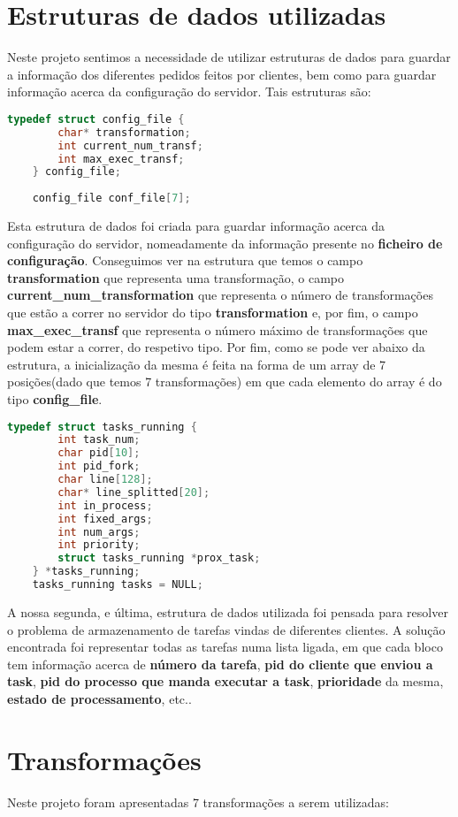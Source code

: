 \documentclass[11pt,a4paper]{report}
\begin{document}
    \section{Estruturas de dados utilizadas}
    Neste projeto sentimos a necessidade de utilizar estruturas de dados para guardar a informação dos diferentes pedidos feitos por clientes, bem como para guardar informação acerca da configuração do servidor. Tais estruturas são:
    \begin{lstlisting}[language=C,firstnumber=1]
    typedef struct config_file {
	    char* transformation;
	    int current_num_transf;
	    int max_exec_transf;
    } config_file;
    
    config_file conf_file[7];
    \end{lstlisting}
    Esta estrutura de dados foi criada para guardar informação acerca da configuração do servidor, nomeadamente da informação presente no \textbf{ficheiro de configuração}. Conseguimos ver na estrutura que temos o campo \textbf{transformation} que representa uma transformação, o campo \textbf{current\_num\_transformation} que representa o número de transformações que estão a correr no servidor do tipo \textbf{transformation} e, por fim, o campo \textbf{max\_exec\_transf} que representa o número máximo de transformações que podem estar a correr, do respetivo tipo. Por fim, como se pode ver abaixo da estrutura, a inicialização da mesma é feita na forma de um array de 7 posições(dado que temos 7 transformações) em que cada elemento do array é do tipo \textbf{config\_file}.
    \\
    \begin{lstlisting}[language=C,firstnumber=1]
    typedef struct tasks_running {
	    int task_num;
	    char pid[10];
	    int pid_fork;
	    char line[128];	
	    char* line_splitted[20];	
	    int in_process;	
	    int fixed_args;
	    int num_args;
	    int priority;
	    struct tasks_running *prox_task;
    } *tasks_running;
    tasks_running tasks = NULL;
    \end{lstlisting}
    A nossa segunda, e última, estrutura de dados utilizada foi pensada para resolver o problema de armazenamento de tarefas vindas de diferentes clientes. A solução encontrada foi representar todas as tarefas numa lista ligada, em que cada bloco tem informação acerca de \textbf{número da tarefa}, \textbf{pid do cliente que enviou a task}, \textbf{pid do processo que manda executar a task}, \textbf{prioridade} da mesma, \textbf{estado de processamento}, etc..

	\section{Transformações}
	Neste projeto foram apresentadas 7 transformações a serem utilizadas:
	
\end{document}
